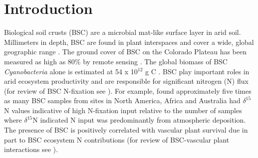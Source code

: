 \section{Introduction}


Biological soil crusts (BSC) are a microbial mat-like surface layer in arid
soil. Millimeters in depth, BSC are found in plant interspaces and cover a wide,
global geographic range \citep{garcia2003estimates}. The ground cover of BSC on
the Colorado Plateau has been measured as high as 80\% by remote sensing
\citep{karnieli2001}. The global biomass of BSC \textit{Cyanobacteria} alone is estimated
at 54 x 10$^{12}$ g C \citep{garcia2003estimates}. BSC play important roles in
arid ecosystem productivity and are responsible for significant nitrogen (N)
flux (for review of BSC N-fixation see \citet{belnap2003}). For example,
\citet{Evans_1999} found approximately five times as many BSC samples from
sites in North America, Africa and Australia had $\delta^{15}$N values
indicative of high N-fixation input relative to the number of samples where
$\delta^{15}$N indicated N input was predominantly from atmospheric deposition.
The presence of BSC is positively correlated with vascular plant
survival due in part to BSC ecosystem N contributions (for review of
BSC-vascular plant interactions see \citet{BelnapVascular}).

